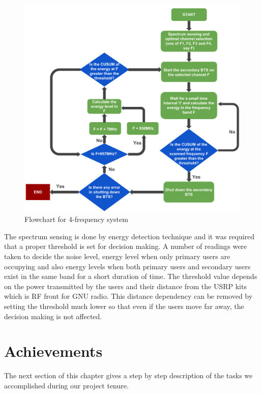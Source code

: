 \begin{figure}
\centering
\includegraphics[width=\textwidth]{../images/freqSys4}
\caption[4-frequency system]{Flowchart for 4-frequency system}
\label{freqSys4}
\end{figure}

The spectrum sensing is done by energy detection technique and it was required 
that a proper threshold is set for decision making. A number of readings were 
taken to decide the noise level, energy level when only primary users are 
occupying and also energy levels when both primary users and secondary users 
exist in the same band for a short duration of time. The threshold value 
depends on the power transmitted by the users and their distance from the USRP 
kits which is RF front for GNU radio. This distance dependency can be removed by 
setting the threshold much lower so that even if the users move 
far away, the decision making is not affected.  






\section{Achievements}
The next section of this chapter gives a step by step description of the tasks we 
accomplished during our project tenure. 

